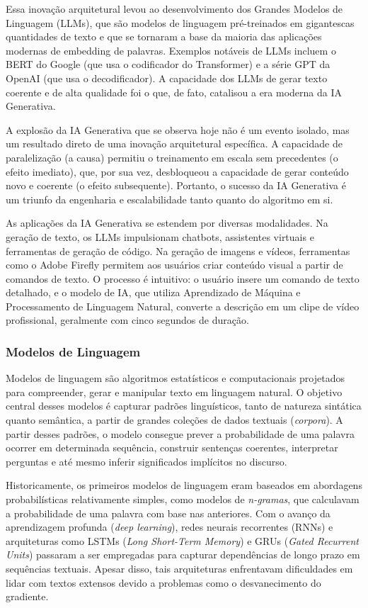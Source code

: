 Essa inovação arquitetural levou ao desenvolvimento dos Grandes Modelos de Linguagem (LLMs), que são modelos de linguagem pré-treinados em gigantescas quantidades de texto e que se tornaram a base da maioria das aplicações modernas de embedding de palavras. Exemplos notáveis de LLMs incluem o BERT do Google (que usa o codificador do Transformer) e a série GPT da OpenAI (que usa o decodificador). A capacidade dos LLMs de gerar texto coerente e de alta qualidade foi o que, de fato, catalisou a era moderna da IA Generativa.

A explosão da IA Generativa que se observa hoje não é um evento isolado, mas um resultado direto de uma inovação arquitetural específica. A capacidade de paralelização (a causa) permitiu o treinamento em escala sem precedentes (o efeito imediato), que, por sua vez, desbloqueou a capacidade de gerar conteúdo novo e coerente (o efeito subsequente). Portanto, o sucesso da IA Generativa é um triunfo da engenharia e escalabilidade tanto quanto do algoritmo em si.

As aplicações da IA Generativa se estendem por diversas modalidades. Na geração de texto, os LLMs impulsionam chatbots, assistentes virtuais e ferramentas de geração de código. Na geração de imagens e vídeos, ferramentas como o Adobe Firefly permitem aos usuários criar conteúdo visual a partir de comandos de texto. O processo é intuitivo: o usuário insere um comando de texto detalhado, e o modelo de IA, que utiliza Aprendizado de Máquina e Processamento de Linguagem Natural, converte a descrição em um clipe de vídeo profissional, geralmente com cinco segundos de duração.

\subsubsection{Modelos de Linguagem}

Modelos de linguagem são algoritmos estatísticos e computacionais projetados para compreender, gerar e manipular texto em linguagem natural. O objetivo central desses modelos é capturar padrões linguísticos, tanto de natureza sintática quanto semântica, a partir de grandes coleções de dados textuais (\emph{corpora}). A partir desses padrões, o modelo consegue prever a probabilidade de uma palavra ocorrer em determinada sequência, construir sentenças coerentes, interpretar perguntas e até mesmo inferir significados implícitos no discurso.

Historicamente, os primeiros modelos de linguagem eram baseados em abordagens probabilísticas relativamente simples, como modelos de \emph{n-gramas}, que calculavam a probabilidade de uma palavra com base nas anteriores. Com o avanço da aprendizagem profunda (\emph{deep learning}), redes neurais recorrentes (RNNs) e arquiteturas como LSTMs (\emph{Long Short-Term Memory}) e GRUs (\emph{Gated Recurrent Units}) passaram a ser empregadas para capturar dependências de longo prazo em sequências textuais. Apesar disso, tais arquiteturas enfrentavam dificuldades em lidar com textos extensos devido a problemas como o desvanecimento do gradiente.

